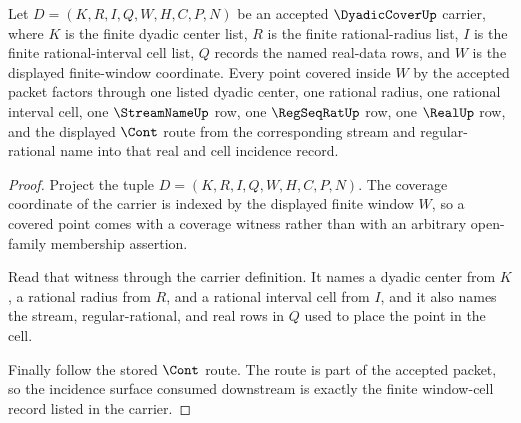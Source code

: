 \begin{theorem}
\label{thm:dyadic-cover-window-cell-incidence}
Let $D=(K,R,I,Q,W,H,C,P,N)$ be an accepted $\DyadicCoverUp$ carrier, where
$K$ is the finite dyadic center list, $R$ is the finite rational-radius list,
$I$ is the finite rational-interval cell list, $Q$ records the named real-data
rows, and $W$ is the displayed finite-window coordinate. Every point covered
inside $W$ by the accepted packet factors through one listed dyadic center, one
rational radius, one rational interval cell, one $\StreamNameUp$ row, one
$\RegSeqRatUp$ row, one $\RealUp$ row, and the displayed $\Cont$ route from
the corresponding stream and regular-rational name into that real and cell
incidence record.
\end{theorem}
\begin{proof}
Project the tuple $D=(K,R,I,Q,W,H,C,P,N)$. The coverage coordinate of the
carrier is indexed by the displayed finite window $W$, so a covered point
comes with a coverage witness rather than with an arbitrary open-family
membership assertion.

Read that witness through the carrier definition. It names a dyadic center
from $K$, a rational radius from $R$, and a rational interval cell from $I$,
and it also names the stream, regular-rational, and real rows in $Q$ used to
place the point in the cell.

Finally follow the stored $\Cont$ route. The route is part of the accepted
packet, so the incidence surface consumed downstream is exactly the finite
window-cell record listed in the carrier.
\end{proof}

